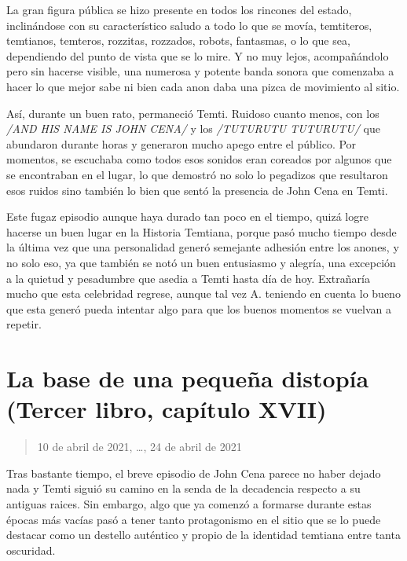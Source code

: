 \documentclass[
]{book}
\begin{document}
La gran figura pública se hizo presente en todos los rincones del estado, inclinándose con su característico saludo a todo lo que se movía, temtiteros, temtianos, temteros, rozzitas, rozzados, robots, fantasmas, o lo que sea, dependiendo del punto de vista que se lo mire. Y no muy lejos, acompañándolo pero sin hacerse visible, una numerosa y potente banda sonora que comenzaba a hacer lo que mejor sabe ni bien cada anon daba una pizca de movimiento al sitio.

Así, durante un buen rato, permaneció Temti. Ruidoso cuanto menos, con los \emph{/AND HIS NAME IS JOHN CENA/} y los \emph{/TUTURUTU TUTURUTU/} que abundaron durante horas y generaron mucho apego entre el público. Por momentos, se escuchaba como todos esos sonidos eran coreados por algunos que se encontraban en el lugar, lo que demostró no solo lo pegadizos que resultaron esos ruidos sino también lo bien que sentó la presencia de John Cena en Temti.

Este fugaz episodio aunque haya durado tan poco en el tiempo, quizá logre hacerse un buen lugar en la Historia Temtiana, porque pasó mucho tiempo desde la última vez que una personalidad generó semejante adhesión entre los anones, y no solo eso, ya que también se notó un buen entusiasmo y alegría, una excepción a la quietud y pesadumbre que asedia a Temti hasta día de hoy. Extrañaría mucho que esta celebridad regrese, aunque tal vez A. teniendo en cuenta lo bueno que esta generó pueda intentar algo para que los buenos momentos se vuelvan a repetir.

\hypertarget{la-base-de-una-pequeuxf1a-distopuxeda-tercer-libro-capuxedtulo-xvii}{%
\section{La base de una pequeña distopía (Tercer libro, capítulo XVII)}\label{la-base-de-una-pequeuxf1a-distopuxeda-tercer-libro-capuxedtulo-xvii}}

\begin{quote}
10 de abril de 2021, \ldots, 24 de abril de 2021
\end{quote}

Tras bastante tiempo, el breve episodio de John Cena parece no haber dejado nada y Temti siguió su camino en la senda de la decadencia respecto a su antiguas raices. Sin embargo, algo que ya comenzó a formarse durante estas épocas más vacías pasó a tener tanto protagonismo en el sitio que se lo puede destacar como un destello auténtico y propio de la identidad temtiana entre tanta oscuridad.
\end{document}
